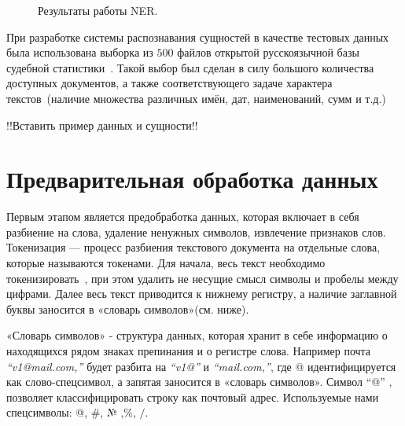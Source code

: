 \documentclass{csmathnotes}
\begin{document}
\begin{figure}[h]
	\caption{Результаты работы NER.}
	\label{fig:ner}
\end{figure}


При разработке системы распознавания сущностей в качестве тестовых данных была использована выборка из $500$ файлов открытой русскоязычной базы судебной статистики~\cite{CourtsData}. Такой выбор был сделан в силу большого количества доступных документов, а также соответствующего задаче характера текстов~(наличие множества различных имён, дат, наименований, сумм и т.д.)


!!Вставить пример данных и сущности!!

\section*{Предварительная обработка данных}
Первым этапом является предобработка данных, которая включает в себя разбиение на слова, удаление ненужных символов, извлечение признаков слов. 
Токенизация — процесс разбиения текстового документа на отдельные слова, которые называются токенами. Для начала, весь текст необходимо токенизировать~\cite{Ner}, при этом удалить не несущие смысл символы и пробелы между цифрами. Далее весь текст приводится к нижнему регистру, а наличие заглавной буквы заносится в «словарь символов»(см. ниже).

«Словарь символов» - структура данных, которая хранит в себе информацию о находящихся рядом знаках препинания и о регистре слова. Например почта \emph{“v1@mail.com,”} будет разбита на \emph{“v1@”} и \emph{“mail.com,”}, где @ идентифицируется как слово-спецсимвол, а запятая заносится в «словарь символов». Символ “@” , позволяет классифицировать строку как почтовый адрес. Используемые нами спецсимволы: @, \#, № ,\%, $/$.
\end{document}
